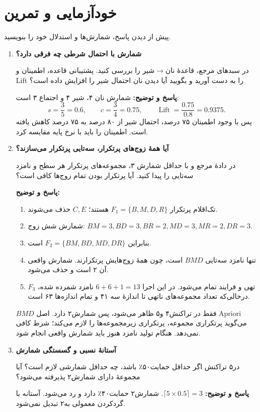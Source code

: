 \documentclass[12pt,a4paper,oneside]{report}
\newcounter{ex}[chapter]
\newenvironment{selftests}{\begin{enumerate}\setlength{\itemsep}{9pt}}{\end{enumerate}}
\newenvironment{selftest}[1]{\item\textbf{#1}\par}{\par}
\newcommand{\answer}[1]{\par{\color{teal}\bfseries پاسخ و توضیح: }#1\par}
\begin{document}
\section{خودآزمایی و تمرین}
پیش از دیدن پاسخ، شمارش‌ها و استدلال خود را بنویسید.
\begin{selftests}
\begin{selftest}{شمارش با احتمال شرطی چه فرقی دارد؟}
در سبدهای مرجع، قاعدهٔ نان$\to$شیر را بررسی کنید. پشتیبانی قاعده، اطمینان و Lift را به دست آورید و بگویید آیا دیدن نان احتمال شیر را افزایش داده است؟
\answer{شمارش نان ۴، شیر ۴ و اجتماع ۳ است:
\[s=\frac35=0.6,\qquad c=\frac34=0.75,\qquad\operatorname{Lift}=\frac{0.75}{0.8}=0.9375.\]
پس با وجود اطمینان ۷۵ درصد، احتمال شیر از ۸۰ درصد به ۷۵ درصد کاهش یافته است. اطمینان را باید با نرخ پایه مقایسه کرد.}
\end{selftest}

\begin{selftest}{آیا همهٔ زوج‌های پرتکرار، سه‌تایی پرتکرار می‌سازند؟}
در دادهٔ مرجع و با حداقل شمارش ۳، مجموعه‌های پرتکرار هر سطح و نامزد سه‌تایی را پیدا کنید. آیا پرتکرار بودن تمام زوج‌ها کافی است؟
\answer{\begin{enumerate}
\item تک‌اقلام پرتکرار $F_1=\{B,M,D,R\}$ هستند؛ $C,E$ حذف می‌شوند.
\item شمارش شش زوج: $BM=3,BD=3,BR=2,MD=3,MR=2,DR=3$.
\item بنابراین $F_2=\{BM,BD,MD,DR\}$ است.
\item تنها نامزد سه‌تایی $BMD$ است، چون همهٔ زوج‌هایش پرتکرارند. شمارش واقعی آن ۲ است و حذف می‌شود.
\item $F_3$ تهی و فرایند تمام می‌شود. در این اجرا $6+6+1=13$ نامزد شمرده شده، درحالی‌که تعداد مجموعه‌های ناتهی تا اندازهٔ سه ۴۱ و تمام اندازه‌ها ۶۳ است.
\end{enumerate}


 $BMD$ فقط در تراکنش۴ و۵ ظاهر می‌شود، پس شمارش۲ دارد. اصل Apriori می‌گوید پرتکراری مجموعه، پرتکراری زیرمجموعه‌ها را لازم می‌کند؛ شرط کافی نمی‌دهد. هنگام تولید نامزد هنوز باید شمارش واقعی انجام شود.}
\end{selftest}

\begin{selftest}{آستانهٔ نسبی و گسستگی شمارش}
در۵ تراکنش اگر حداقل حمایت۵۰٪ باشد، چه حداقل شمارشی لازم است؟ آیا مجموعهٔ دارای شمارش۲ پذیرفته می‌شود؟
\answer{$\lceil5\times0.5\rceil=3$. شمارش۲ حمایت۴۰٪ دارد و رد می‌شود. آستانه با گردکردن معمولی به۲ تبدیل نمی‌شود.}
\end{selftest}


\end{selftests}
\end{document}
